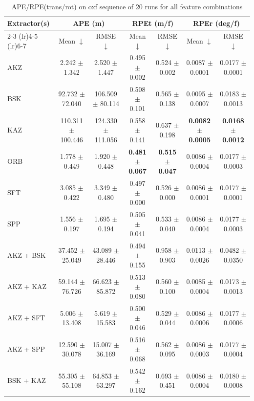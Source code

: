 \begin{table}[hbp]
\centering
\caption{APE/RPE(trans/rot) on oxf sequence of 20 runs for all feature combinations}
\scriptsize
\label{tab:oxf_ape_rpe}\
\setlength{\tabcolsep}{3pt}
\begin{tabular}{lcccccc}
\toprule
\textbf{Extractor(s)}
& \multicolumn{2}{c}{\textbf{APE (m)}}
& \multicolumn{2}{c}{\textbf{RPEt (m/f)}}
& \multicolumn{2}{c}{\textbf{RPEr (deg/f)}} \\
\cmidrule(lr){2-3} \cmidrule(lr){4-5} \cmidrule(lr){6-7}
& Mean $\downarrow$ & RMSE $\downarrow$
& Mean $\downarrow$ & RMSE $\downarrow$
& Mean $\downarrow$ & RMSE $\downarrow$ \\
\midrule
AKZ & 2.242 $\pm$ 1.342 & 2.520 $\pm$ 1.447 & 0.495 $\pm$ 0.002 & 0.524 $\pm$ 0.002 & 0.0087 $\pm$ 0.0001 & 0.0177 $\pm$ 0.0001 \\
BSK & 92.732 $\pm$ 72.040 & 106.509 $\pm$ 80.114 & 0.508 $\pm$ 0.101 & 0.565 $\pm$ 0.138 & 0.0095 $\pm$ 0.0007 & 0.0183 $\pm$ 0.0013 \\
KAZ & 110.311 $\pm$ 100.446 & 124.330 $\pm$ 111.056 & 0.558 $\pm$ 0.141 & 0.637 $\pm$ 0.198 & \textbf{0.0082 $\pm$ 0.0005} & \textbf{0.0168 $\pm$ 0.0012} \\
ORB & 1.778 $\pm$ 0.449 & 1.920 $\pm$ 0.448 & \textbf{0.481 $\pm$ 0.067} & \textbf{0.515 $\pm$ 0.047} & 0.0086 $\pm$ 0.0004 & 0.0177 $\pm$ 0.0003 \\
SFT & 3.085 $\pm$ 0.422 & 3.349 $\pm$ 0.480 & 0.497 $\pm$ 0.000 & 0.526 $\pm$ 0.000 & 0.0086 $\pm$ 0.0001 & 0.0177 $\pm$ 0.0001 \\
SPP & 1.556 $\pm$ 0.197 & 1.695 $\pm$ 0.194 & 0.505 $\pm$ 0.041 & 0.533 $\pm$ 0.040 & 0.0086 $\pm$ 0.0004 & 0.0177 $\pm$ 0.0003 \\
AKZ + BSK & 37.452 $\pm$ 25.049 & 43.089 $\pm$ 28.446 & 0.494 $\pm$ 0.155 & 0.958 $\pm$ 0.903 & 0.0113 $\pm$ 0.0026 & 0.0482 $\pm$ 0.0350 \\
AKZ + KAZ & 59.144 $\pm$ 76.726 & 66.623 $\pm$ 85.872 & 0.513 $\pm$ 0.080 & 0.560 $\pm$ 0.100 & 0.0085 $\pm$ 0.0004 & 0.0173 $\pm$ 0.0013 \\
AKZ + SFT & 5.006 $\pm$ 13.408 & 5.619 $\pm$ 15.583 & 0.500 $\pm$ 0.046 & 0.529 $\pm$ 0.044 & 0.0086 $\pm$ 0.0006 & 0.0177 $\pm$ 0.0006 \\
AKZ + SPP & 12.590 $\pm$ 30.078 & 15.007 $\pm$ 36.169 & 0.516 $\pm$ 0.068 & 0.562 $\pm$ 0.095 & 0.0086 $\pm$ 0.0003 & 0.0177 $\pm$ 0.0004 \\
BSK + KAZ & 55.305 $\pm$ 55.108 & 64.853 $\pm$ 63.297 & 0.542 $\pm$ 0.162 & 0.693 $\pm$ 0.451 & 0.0086 $\pm$ 0.0004 & 0.0180 $\pm$ 0.0008 \\

\end{tabular}
\end{table}
